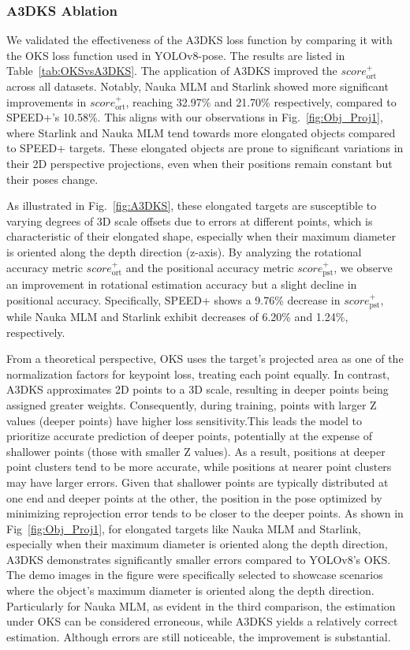 \documentclass[a4paper,fleqn]{cas-sc}
\begin{document}
\subsubsection{A3DKS Ablation} \label{A3DKS_Ablation_subsection}
We validated the effectiveness of the A3DKS loss function by comparing it with the OKS loss function used in YOLOv8-pose. The results are listed in Table~\ref{tab:OKSvsA3DKS}. The application of A3DKS improved the $score_{\text{ort}}^+$ across all datasets. Notably, Nauka MLM and Starlink showed more significant improvements in $score_{\text{ort}}^+$, reaching 32.97\% and 21.70\% respectively, compared to SPEED+'s 10.58\%. This aligns with our observations in Fig.~\ref{fig:Obj_Proj1}, where Starlink and Nauka MLM tend towards more elongated objects compared to SPEED+ targets. These elongated objects are prone to significant variations in their 2D perspective projections, even when their positions remain constant but their poses change.

As illustrated in Fig.~\ref{fig:A3DKS}, these elongated targets are susceptible to varying degrees of 3D scale offsets due to errors at different points, which is characteristic of their elongated shape, especially when their maximum diameter is oriented along the depth direction (z-axis). By analyzing the rotational accuracy metric $score_{\text{ort}}^+$ and the positional accuracy metric $score_{\text{pst}}^+$, we observe an improvement in rotational estimation accuracy but a slight decline in positional accuracy. Specifically, SPEED+ shows a 9.76\% decrease in $score_{\text{pst}}^+$, while Nauka MLM and Starlink exhibit decreases of 6.20\% and 1.24\%, respectively.

From a theoretical perspective, OKS uses the target's projected area as one of the normalization factors for keypoint loss, treating each point equally. In contrast, A3DKS approximates 2D points to a 3D scale, resulting in deeper points being assigned greater weights. Consequently, during training, points with larger Z values (deeper points) have higher loss sensitivity.This leads the model to prioritize accurate prediction of deeper points, potentially at the expense of shallower points (those with smaller Z values). As a result, positions at deeper point clusters tend to be more accurate, while positions at nearer point clusters may have larger errors. Given that shallower points are typically distributed at one end and deeper points at the other, the position in the pose optimized by minimizing reprojection error tends to be closer to the deeper points. As shown in Fig~\ref{fig:Obj_Proj1}, for elongated targets like Nauka MLM and Starlink, especially when their maximum diameter is oriented along the depth direction, A3DKS demonstrates significantly smaller errors compared to YOLOv8's OKS. The demo images in the figure were specifically selected to showcase scenarios where the object's maximum diameter is oriented along the depth direction. Particularly for Nauka MLM, as evident in the third comparison, the estimation under OKS can be considered erroneous, while A3DKS yields a relatively correct estimation. Although errors are still noticeable, the improvement is substantial.
\end{document}
